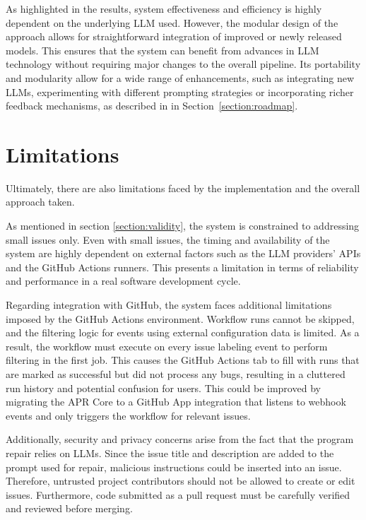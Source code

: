 As highlighted in the results, system effectiveness and efficiency is highly dependent on the underlying \ac{LLM} used. However, the modular design of the approach allows for straightforward integration of improved or newly released models. This ensures that the system can benefit from advances in \ac{LLM} technology without requiring major changes to the overall pipeline. Its portability and modularity allow for a wide range of enhancements, such as integrating new \acp{LLM}, experimenting with different prompting strategies or incorporating richer feedback mechanisms, as described in in Section~\ref{section:roadmap}.

\section{Limitations}
Ultimately, there are also limitations faced by the implementation and the overall approach taken.

As mentioned in section \ref{section:validity}, the system is constrained to addressing small issues only. Even with small issues, the timing and availability of the system are highly dependent on external factors such as the \ac{LLM} providers' APIs and the GitHub Actions runners. This presents a limitation in terms of reliability and performance in a real software development cycle.

Regarding integration with GitHub, the system faces additional limitations imposed by the GitHub Actions environment. Workflow runs cannot be skipped, and the filtering logic for events using external configuration data is limited. As a result, the workflow must execute on every issue labeling event to perform filtering in the first job. This causes the GitHub Actions tab to fill with runs that are marked as successful but did not process any bugs, resulting in a cluttered run history and potential confusion for users. This could be improved by migrating the APR Core to a GitHub App integration that listens to webhook events and only triggers the workflow for relevant issues.

Additionally, security and privacy concerns arise from the fact that the program repair relies on \acp{LLM}. Since the issue title and description are added to the prompt used for repair, malicious instructions could be inserted into an issue. Therefore, untrusted project contributors should not be allowed to create or edit issues. Furthermore, code submitted as a pull request must be carefully verified and reviewed before merging.


